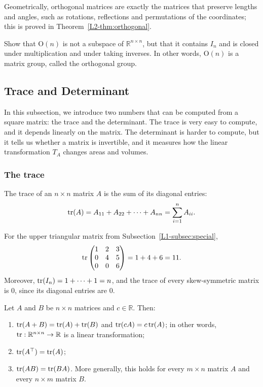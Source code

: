 Geometrically, orthogonal matrices are exactly the matrices that preserve lengths and angles, such as rotations, reflections and permutations of the coordinates; this is proved in Theorem~\ref{L2-thm:orthogonal}.

\begin{exercise}
    Show that $\mathrm{O}(n)$ is not a subspace of $\mathbb{R}^{n \times n}$, but that it contains $I_n$ and is closed under multiplication and under taking inverses. In other words, $\mathrm{O}(n)$ is a matrix group, called the orthogonal group.
\end{exercise}

\subsection{Trace and Determinant}\label{L1-subsec:trace-det}

In this subsection, we introduce two numbers that can be computed from a square matrix: the trace and the determinant. The trace is very easy to compute, and it depends linearly on the matrix. The determinant is harder to compute, but it tells us whether a matrix is invertible, and it measures how the linear transformation $T_A$ changes areas and volumes.

\subsubsection{The trace}

\begin{definition}[Trace]
    The trace of an $n \times n$ matrix $A$ is the sum of its diagonal entries:
    \[\operatorname{tr}(A) = A_{11} + A_{22} + \cdots + A_{nn} = \sum_{i=1}^n A_{ii}.\]
\end{definition}

\begin{example}
    For the upper triangular matrix from Subsection~\ref{L1-subsec:special},
    \[\operatorname{tr} \begin{pmatrix}
        1 & 2 & 3 \\
        0 & 4 & 5 \\
        0 & 0 & 6
    \end{pmatrix} = 1 + 4 + 6 = 11.\]
    Moreover, $\operatorname{tr}(I_n) = 1 + \cdots + 1 = n$, and the trace of every skew-symmetric matrix is $0$, since its diagonal entries are $0$.
\end{example}

\begin{theorem}\label{L1-thm:trace}
    Let $A$ and $B$ be $n \times n$ matrices and $c \in \mathbb{R}$. Then:
    \begin{enumerate}
        \item $\operatorname{tr}(A + B) = \operatorname{tr}(A) + \operatorname{tr}(B)$ and $\operatorname{tr}(cA) = c \operatorname{tr}(A)$; in other words, $\operatorname{tr}: \mathbb{R}^{n \times n} \to \mathbb{R}$ is a linear transformation;
        \item $\operatorname{tr}(A^\top) = \operatorname{tr}(A)$;
        \item $\operatorname{tr}(AB) = \operatorname{tr}(BA)$. More generally, this holds for every $m \times n$ matrix $A$ and every $n \times m$ matrix $B$.
    \end{enumerate}
\end{theorem}

